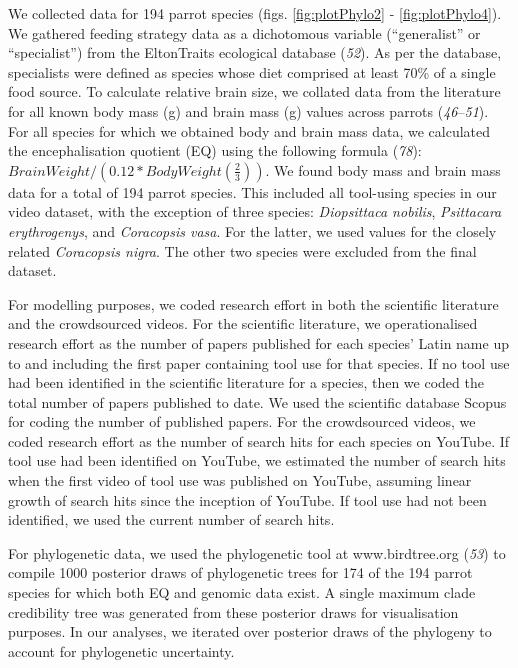 \documentclass[
  man,floatsintext]{apa6}
\begin{document}
We collected data for 194 parrot species (figs.
\ref{fig:plotPhylo2} - \ref{fig:plotPhylo4}). We gathered feeding strategy
data as a dichotomous variable (``generalist'' or ``specialist'') from the
EltonTraits ecological database (\emph{52}). As per the database, specialists
were defined as species whose diet comprised at least 70\% of a single food
source. To calculate relative brain size, we collated data from the literature
for all known body mass (g) and brain mass (g) values across
parrots (\emph{46}--\emph{51}). For all species for which we obtained body and brain mass data, we
calculated the encephalisation quotient (EQ) using the following
formula (\emph{78}): \(BrainWeight / (0.12 * BodyWeight(\frac{2}{3}))\). We
found body mass and brain mass data for a total of 194 parrot species. This
included all tool-using species in our video dataset, with the exception of
three species: \emph{Diopsittaca nobilis}, \emph{Psittacara erythrogenys}, and \emph{Coracopsis
vasa}. For the latter, we used values for the closely related \emph{Coracopsis
nigra}. The other two species were excluded from the final dataset.

For modelling purposes, we coded research effort in both the scientific
literature and the crowdsourced videos. For the scientific literature, we
operationalised research effort as the number of papers published for each
species' Latin name up to and including the first paper containing tool use for
that species. If no tool use had been identified in the scientific literature
for a species, then we coded the total number of papers published to date. We
used the scientific database Scopus for coding the number of published papers.
For the crowdsourced videos, we coded research effort as the number of search
hits for each species on YouTube. If tool use had been identified on YouTube, we
estimated the number of search hits when the first video of tool use was
published on YouTube, assuming linear growth of search hits since the inception
of YouTube. If tool use had not been identified, we used the current number of
search hits.

For phylogenetic data, we used the phylogenetic tool at www.birdtree.org
(\emph{53}) to compile 1000 posterior draws of phylogenetic trees for 174 of the
194 parrot species for which both EQ and genomic data exist. A single maximum
clade credibility tree was generated from these posterior draws for
visualisation purposes. In our analyses, we iterated over posterior draws of the
phylogeny to account for phylogenetic uncertainty.
\end{document}

